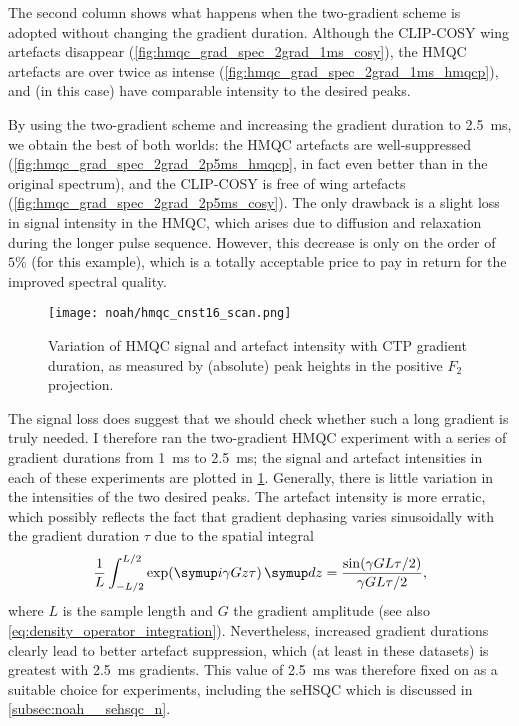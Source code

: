 The second column shows what happens when the two-gradient scheme is adopted without changing the gradient duration.
Although the CLIP-COSY wing artefacts disappear (\cref{fig:hmqc_grad_spec_2grad_1ms_cosy}), the HMQC artefacts are over twice as intense (\cref{fig:hmqc_grad_spec_2grad_1ms_hmqcp}), and (in this case) have comparable intensity to the desired peaks.

By using the two-gradient scheme and increasing the gradient duration to \qty{2.5}{\ms}, we obtain the best of both worlds: the HMQC artefacts are well-suppressed (\cref{fig:hmqc_grad_spec_2grad_2p5ms_hmqcp}, in fact even better than in the original spectrum), and the CLIP-COSY is free of wing artefacts (\cref{fig:hmqc_grad_spec_2grad_2p5ms_cosy}).
The only drawback is a slight loss in signal intensity in the HMQC, which arises due to diffusion and relaxation during the longer pulse sequence.
However, this decrease is only on the order of $5\%$ (for this example), which is a totally acceptable price to pay in return for the improved spectral quality.

\begin{figure}[!ht]
    \centering
    \texttt{[image: noah/hmqc\_cnst16\_scan.png]}%
    \caption[Variation of HMQC signal and artefact intensity with CTP gradient duration]{
        Variation of HMQC signal and artefact intensity with CTP gradient duration, as measured by (absolute) peak heights in the positive $F_2$ projection.
    }
    \label{fig:hmqc_cnst16}
\end{figure}

The signal loss does suggest that we should check whether such a long gradient is truly needed.
I therefore ran the two-gradient HMQC experiment with a series of gradient durations from \qty{1}{\ms} to \qty{2.5}{\ms}; the signal and artefact intensities in each of these experiments are plotted in \cref{fig:hmqc_cnst16}.
Generally, there is little variation in the intensities of the two desired peaks.
The artefact intensity is more erratic, which possibly reflects the fact that gradient dephasing varies sinusoidally with the gradient duration $\tau$ due to the spatial integral
\begin{equation}
    \label{eq:gradient_dephasing}
    \frac{1}{L} \int_{-L/2}^{L/2} \exp(\mi \gamma Gz\tau)\,\md z = \frac{\sin(\gamma G L\tau/2)}{\gamma GL\tau/2},
\end{equation}
where $L$ is the sample length and $G$ the gradient amplitude (see also \cref{eq:density_operator_integration}).
Nevertheless, increased gradient durations clearly lead to better artefact suppression, which (at least in these datasets) is greatest with \qty{2.5}{\ms} gradients.
This value of \qty{2.5}{\ms} was therefore fixed on as a suitable choice for \nitrogen{} experiments, including the seHSQC which is discussed in \cref{subsec:noah__sehsqc_n}.



